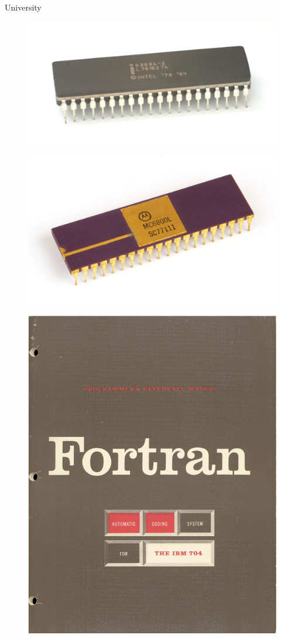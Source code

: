 \documentclass{beamer}
\begin{document}
  \begin{frame}{University}
    \begin{figure}
      \includegraphics[scale=0.1]{images/8086}
      \includegraphics[scale=0.5]{images/6800}
    \end{figure}
    \begin{figure}
      \includegraphics[scale=0.1]{images/fortran}

\end{figure}
\end{frame}
\end{document}
